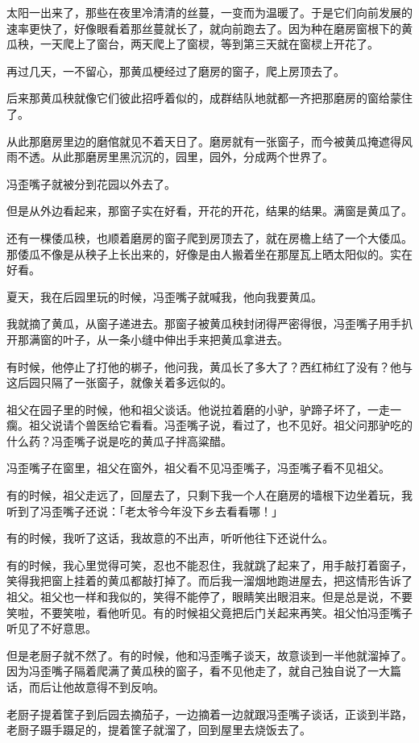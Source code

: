 \documentclass[UTF8]{ctexart}
\begin{document}
太阳一出来了，那些在夜里冷清清的丝蔓，一变而为温暖了。于是它们向前发展的速率更快了，好像眼看着那丝蔓就长了，就向前跑去了。因为种在磨房窗根下的黄瓜秧，一天爬上了窗台，两天爬上了窗棂，等到第三天就在窗棂上开花了。

再过几天，一不留心，那黄瓜梗经过了磨房的窗子，爬上房顶去了。

后来那黄瓜秧就像它们彼此招呼着似的，成群结队地就都一齐把那磨房的窗给蒙住了。

从此那磨房里边的磨倌就见不着天日了。磨房就有一张窗子，而今被黄瓜掩遮得风雨不透。从此那磨房里黑沉沉的，园里，园外，分成两个世界了。

冯歪嘴子就被分到花园以外去了。

但是从外边看起来，那窗子实在好看，开花的开花，结果的结果。满窗是黄瓜了。

还有一棵倭瓜秧，也顺着磨房的窗子爬到房顶去了，就在房檐上结了一个大倭瓜。那倭瓜不像是从秧子上长出来的，好像是由人搬着坐在那屋瓦上晒太阳似的。实在好看。

夏天，我在后园里玩的时候，冯歪嘴子就喊我，他向我要黄瓜。

我就摘了黄瓜，从窗子递进去。那窗子被黄瓜秧封闭得严密得很，冯歪嘴子用手扒开那满窗的叶子，从一条小缝中伸出手来把黄瓜拿进去。

有时候，他停止了打他的梆子，他问我，黄瓜长了多大了？西红柿红了没有？他与这后园只隔了一张窗子，就像关着多远似的。

祖父在园子里的时候，他和祖父谈话。他说拉着磨的小驴，驴蹄子坏了，一走一瘸。祖父说请个兽医给它看看。冯歪嘴子说，看过了，也不见好。祖父问那驴吃的什么药？冯歪嘴子说是吃的黄瓜子拌高粱醋。

冯歪嘴子在窗里，祖父在窗外，祖父看不见冯歪嘴子，冯歪嘴子看不见祖父。

有的时候，祖父走远了，回屋去了，只剩下我一个人在磨房的墙根下边坐着玩，我听到了冯歪嘴子还说：「老太爷今年没下乡去看看哪！」

有的时候，我听了这话，我故意的不出声，听听他往下还说什么。

有的时候，我心里觉得可笑，忍也不能忍住，我就跳了起来了，用手敲打着窗子，笑得我把窗上挂着的黄瓜都敲打掉了。而后我一溜烟地跑进屋去，把这情形告诉了祖父。祖父也一样和我似的，笑得不能停了，眼睛笑出眼泪来。但是总是说，不要笑啦，不要笑啦，看他听见。有的时候祖父竟把后门关起来再笑。祖父怕冯歪嘴子听见了不好意思。

但是老厨子就不然了。有的时候，他和冯歪嘴子谈天，故意谈到一半他就溜掉了。因为冯歪嘴子隔着爬满了黄瓜秧的窗子，看不见他走了，就自己独自说了一大篇话，而后让他故意得不到反响。

老厨子提着筐子到后园去摘茄子，一边摘着一边就跟冯歪嘴子谈话，正谈到半路，老厨子蹑手蹑足的，提着筐子就溜了，回到屋里去烧饭去了。
\end{document}
